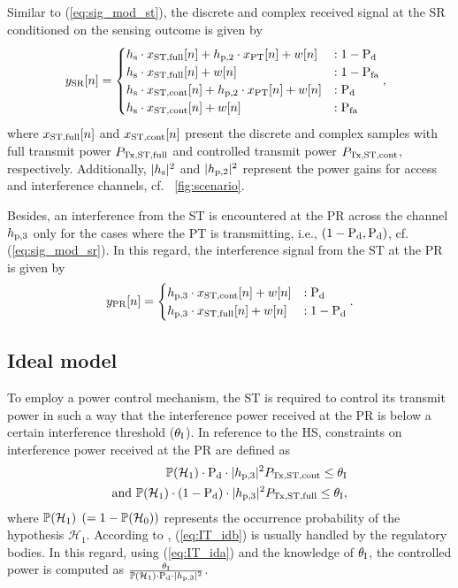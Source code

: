 Similar to (\ref{eq:sig_mod_st}), the discrete and complex received signal at the SR conditioned on the sensing outcome is given by 
\begin{equation}
\hspace{-2.3mm}
\ys[n] = 
\begin{cases}
\hs \cdot \xsfull[n] + \hptw \cdot \xp[n] + w[n] &: 1 - \pd \\
\hs \cdot \xsfull[n] + w[n] &: 1 - \pfa \\
\hs \cdot \xscont[n] + \hptw \cdot \xp[n] + w[n] &: \pd \\
\hs \cdot \xscont[n] + w[n] &: \pfa 
\end{cases},
\label{eq:sig_mod_sr}
\end{equation}
where $x_{\text{ST,full}}[n]$ and $x_{\text{ST,cont}}[n]$ present the discrete and complex samples with full transmit power $P_{\text{Tx,ST,full}}$ and controlled transmit power $P_{\text{Tx,ST,cont}}$, respectively. Additionally, $|h_{\text{s}}|^2$ and $|h_{\text{p,2}}|^2$ represent the power gains for access and interference channels, cf. \figurename~\ref{fig:scenario}. 


Besides, an interference from the ST is encountered at the PR across the channel $h_{\text{p,3}}$ only for the cases where the PT is transmitting, i.e., $(1 - \text{P}_{\text{d}}, \text{P}_{\text{d}})$, cf. (\ref{eq:sig_mod_sr}). In this regard, the interference signal from the ST at the PR is given by
\begin{equation}
y_{\text{PR}}[n] = 
\begin{cases}
h_{\text{p,3}} \cdot x_{\text{ST,cont}}[n] + w[n] & : \text{P}_{\text{d}} \\
h_{\text{p,3}} \cdot x_{\text{ST,full}}[n] + w[n] & : 1- \text{P}_{\text{d}} 
\end{cases}.
\label{eq:sig_mod_pr}
\end{equation}

\subsection*{Ideal model}
To employ a power control mechanism, the ST is required to control its transmit power in such a way that the interference power received at the PR is below a certain interference threshold ($\theta_{\text{I}}$). In reference to the HS, constraints on interference power received at the PR are defined as
\begin{align}
\mathbb P(\mathcal{H}_1) \cdot \text{P}_{\text{d}} \cdot |h_{\text{p,3}}|^2 P_{\text{Tx,ST,cont}} \le \theta_{\text{I}} \label{eq:IT_ida} \\
\text{and   } \mathbb P(\mathcal{H}_1) \cdot (1 - \text{P}_{\text{d}}) \cdot |h_{\text{p,3}}|^2 P_{\text{Tx,ST,full}} \le \theta_{\text{I}} \label{eq:IT_idb},
\end{align}
where $\mathbb P(\mathcal{H}_1)$ $(= 1 - \mathbb P(\mathcal{H}_0))$ represents the occurrence probability of the hypothesis $\mathcal H_1$. 
According to \cite{Sharma14}, (\ref{eq:IT_idb}) is usually handled by the regulatory bodies. In this regard, using (\ref{eq:IT_ida}) and the knowledge of $\theta_{\text{I}}$, the controlled power is computed as $\frac{\theta_{\text{I}}}{\mathbb P(\mathcal{H}_1) \cdot \text{P}_{\text{d}} \cdot |h_{\text{p,3}}|^2}$.

